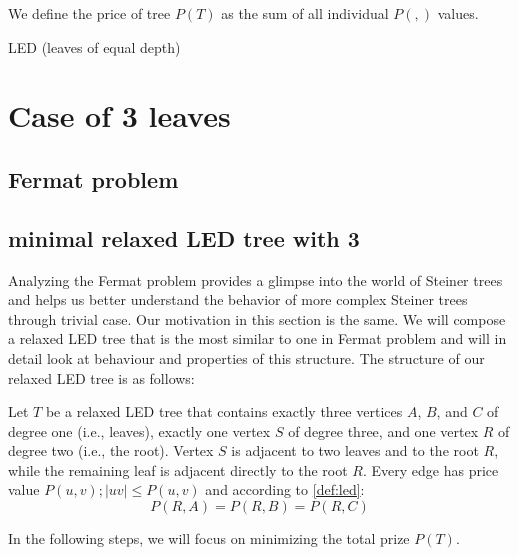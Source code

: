 \documentclass[12pt]{book}
\newcommand{\Price}[2]{P(#1,#2)}
\newcommand{\Ptotal}[1]{P(#1)}
\begin{document}
		We define the price of tree \(\Ptotal{T}\) as the sum of all individual \(\Price{}{}\) values.
	
	LED (leaves of equal depth)

	
	
	\maketitle

	\chapter{Case of 3 leaves}
	
	
	 
	\section{Fermat problem}
	
	
	
	\section{minimal relaxed LED tree with 3}
	
	Analyzing the Fermat problem provides a glimpse into the world of Steiner trees and helps us better understand the behavior of more complex Steiner trees through trivial case. Our motivation in this section is the same. We will compose a relaxed LED tree that is the most similar to one in Fermat problem and will in detail look at behaviour and properties of this structure. The structure of our relaxed LED tree is as follows:
	
	Let \( T \) be a relaxed LED tree that contains exactly three vertices \( A \), \( B \), and \( C \) of degree one (i.e., leaves), exactly one vertex \( S \) of degree three, and one vertex \( R \) of degree two (i.e., the root). Vertex \( S \) is adjacent to two leaves and to the root \( R \), while the remaining leaf is adjacent directly to the root \( R \). Every edge has price value \(\Price{u}{v}; |uv| \leq \Price{u}{v} \) and according to \cref{def:led}: 
	\[
	\Price{R}{A} = \Price{R}{B} = \Price{R}{C}
	\] 
	
	In the following steps, we will focus on minimizing the total prize \(\Ptotal{T}\).
	
	
	
\end{document}

